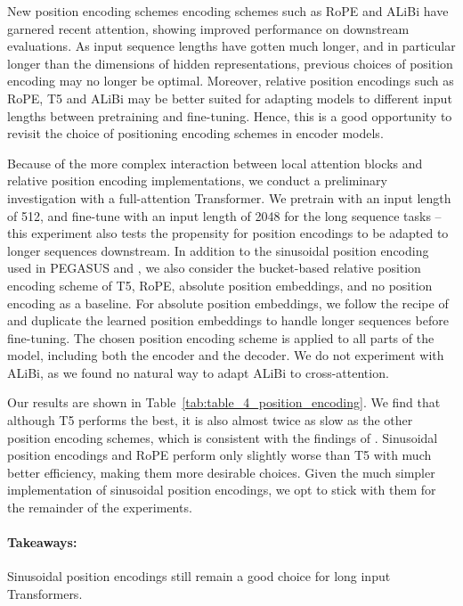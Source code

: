 \documentclass[11pt]{article}
\begin{document}
New position encoding schemes encoding schemes such as RoPE \citep{su2021rope} and ALiBi \citep{press2022alibi} have garnered recent attention, showing improved performance on downstream evaluations.
As input sequence lengths have gotten much longer, and in particular longer than the dimensions of hidden representations, previous choices of position encoding may no longer be optimal.
Moreover, relative position encodings such as RoPE, T5 and ALiBi may be better suited for adapting models to different input lengths between pretraining and fine-tuning.
Hence, this is a good opportunity to revisit the choice of positioning encoding schemes in encoder models.

Because of the more complex interaction between local attention blocks and relative position encoding implementations, we conduct a preliminary investigation with a full-attention Transformer.
We pretrain with an input length of 512, and fine-tune with an input length of 2048 for the long sequence tasks -- this experiment also tests the propensity for position encodings to be adapted to longer sequences downstream.
In addition to the sinusoidal position encoding used in PEGASUS and \citet{vaswani2017transformer}, we also consider the bucket-based relative position encoding scheme of T5, RoPE, absolute position embeddings, and no position encoding as a baseline.
For absolute position embeddings, we follow the recipe of \citet{beltagy2020longformer} and duplicate the learned position embeddings to handle longer sequences before fine-tuning.
The chosen position encoding scheme is applied to all parts of the model, including both the encoder and the decoder.
We do not experiment with ALiBi, as we found no natural way to adapt ALiBi to cross-attention.

Our results are shown in Table~\ref{tab:table_4_position_encoding}.
We find that although T5 performs the best, it is also almost twice as slow as the other position encoding schemes, which is consistent with the findings of \citet{press2022alibi}.
Sinusoidal position encodings and RoPE perform only slightly worse than T5 with much better efficiency, making them more desirable choices.
Given the much simpler implementation of sinusoidal position encodings, we opt to stick with them for the remainder of the experiments.

\paragraph{Takeaways:} Sinusoidal position encodings still remain a good choice for long input Transformers.
\end{document}
